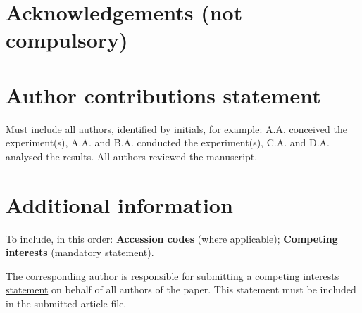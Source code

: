 \documentclass[fleqn,10pt]{wlscirep}
\begin{document}




\section*{Acknowledgements (not compulsory)}


\section*{Author contributions statement}

Must include all authors, identified by initials, for example:
A.A. conceived the experiment(s),  A.A. and B.A. conducted the experiment(s), C.A. and D.A. analysed the results.  All authors reviewed the manuscript. 

\section*{Additional information}

To include, in this order: \textbf{Accession codes} (where applicable); \textbf{Competing interests} (mandatory statement). 

The corresponding author is responsible for submitting a \href{http://www.nature.com/srep/policies/index.html#competing}{competing interests statement} on behalf of all authors of the paper. This statement must be included in the submitted article file.



\end{document}
